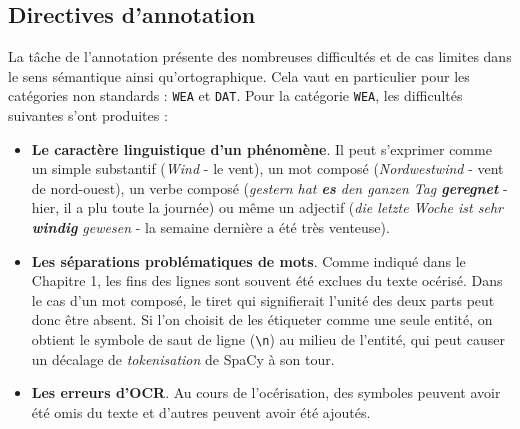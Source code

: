 \documentclass[a4paper,twoside,12pt]{article}
\begin{document}
\subsection{Directives d'annotation}

La tâche de l'annotation présente des nombreuses difficultés et de cas limites dans le sens sémantique ainsi qu'ortographique. Cela vaut en particulier pour les catégories non standards : \texttt{WEA} et \texttt{DAT}. Pour la catégorie \texttt{WEA}, les difficultés suivantes s'ont produites :
\vspace{1ex}
\begin{itemize}[label=$\bullet$]
    \item \textbf{Le caractère linguistique d'un phénomène}. Il peut s'exprimer comme un simple substantif (\textit{Wind} - le vent), un mot composé (\textit{Nordwestwind} - vent de nord-ouest), un verbe composé (\textit{gestern hat \textbf{es} den ganzen Tag \textbf{geregnet}} - hier, il a plu toute la journée) ou même un adjectif (\textit{die letzte Woche ist sehr \textbf{windig} gewesen} - la semaine dernière a été très venteuse).
    \item \textbf{Les séparations problématiques de mots}. Comme indiqué dans le Chapitre 1, les fins des lignes sont souvent été exclues du texte océrisé. Dans le cas d'un mot composé, le tiret qui signifierait l'unité des deux parts peut donc être absent. Si l'on choisit de les étiqueter comme une seule entité, on obtient le symbole de saut de ligne (\texttt{\textbackslash n}) au milieu de l'entité, qui peut causer un décalage de \textit{tokenisation} de SpaCy à son tour.
    \item \textbf{Les erreurs d'OCR}. Au cours de l'océrisation, des symboles peuvent avoir été omis du texte et d'autres peuvent avoir été ajoutés.
\end{itemize}
\vspace{2ex}
\end{document}
